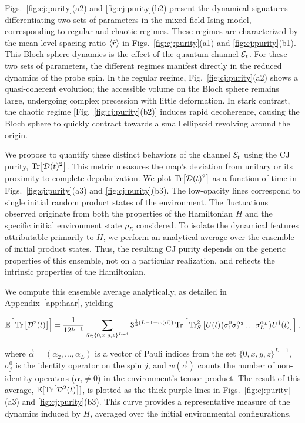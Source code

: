 \documentclass[letterpaper,superscriptaddress,aps,pra,nolongbibliography,showpacs,floatfix,dvipsnames,10pt,twocolumn]{revtex4-2}
\begin{document}
Figs.~\ref{fig:cj:purity}(a2) and \ref{fig:cj:purity}(b2) present the dynamical
signatures differentiating two sets of parameters in the mixed-field 
Ising model,
corresponding to regular and chaotic regimes. These regimes are
characterized by the mean level spacing ratio $\expval{\tilde{r}}$
in Figs.~\ref{fig:cj:purity}(a1) and \ref{fig:cj:purity}(b1).
This Bloch sphere dynamics is the effect of the quantum channel
$\mathcal{E}_t$. For these two sets of parameters, the different regimes
manifest directly in the reduced dynamics of the probe spin. In
the regular regime, Fig.~\ref{fig:cj:purity}(a2) shows a
quasi-coherent evolution; the accessible volume on the Bloch
sphere remains large, undergoing complex precession with little
deformation. In stark contrast, the chaotic regime
[Fig.~\ref{fig:cj:purity}(b2)] induces rapid decoherence, causing
the Bloch sphere to quickly contract towards a small ellipsoid
revolving around the origin.

We propose to quantify these distinct behaviors of the channel
$\mathcal{E}_t$ using the CJ purity, $\Tr[\mathcal{D}(t)^2]$. This
metric measures the map's deviation from unitary or its
proximity to complete depolarization. We plot $\Tr[\mathcal{D}(t)^2]$ as a
function of time in Figs.~\ref{fig:cj:purity}(a3) and
\ref{fig:cj:purity}(b3). The low-opacity lines correspond to
single initial random product states of the environment. The
fluctuations observed originate from both the properties of the
Hamiltonian $H$ and the specific initial environment state
$\rho_E$ considered.
To isolate the dynamical features attributable primarily to $H$,
we perform an analytical average over the ensemble of initial
product states. Thus, the resulting CJ purity depends on
the generic properties of this ensemble, not on a particular
realization, and reflects the intrinsic properties of the
Hamiltonian.

We compute this ensemble average analytically, as detailed
in Appendix~\ref{app:haar}, yielding
\begin{widetext}
\begin{equation}\label{eq:haar:avg:choi}
\mathbb{E}\Big[\Tr\bqty{\mathcal{D}^{2}(t)}\Big] 
= 
\frac{1}{12^{L-1}} \sum_{\vec{\alpha} \in \{0,x,y,z\}^{L-1}}
  3^{\frac{1}{2}\qty(L - 1 - w(\vec{\alpha}))}
\Tr \Big[ \Tr_S^2 \big[U(t)
\qty(\sigma_1^0 \sigma_2^{\alpha_2} \ldots \sigma_L^{\alpha_L})
U^\dagger(t) \big] \Big] \, ,
\end{equation}
\end{widetext}
where $\vec{\alpha} = (\alpha_2, \dots, \alpha_L)$ is a vector of Pauli
indices from the set $\{0,x,y,z\}^{L-1}$, $\sigma_j^0$ is the
identity operator on the spin $j$, and $w(\vec{\alpha})$ counts the
number of non-identity operators ($\alpha_i \neq 0$) in the
environment's tensor product.
The result of this average, $\mathbb{E}[\Tr[\mathcal{D}^{2}(t)]]$,
is plotted as the thick purple lines in
Figs.~\ref{fig:cj:purity}(a3) and \ref{fig:cj:purity}(b3).
This curve provides a representative measure of the dynamics
induced by $H$, averaged over the initial environmental
configurations.
\end{document}
